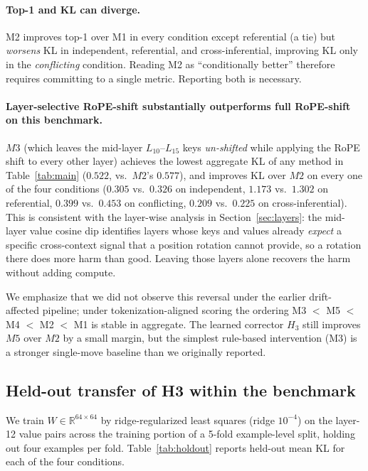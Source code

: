 \paragraph{Top-1 and KL can diverge.} M2 improves top-1 over M1 in every condition except referential (a tie) but \emph{worsens} KL in independent, referential, and cross-inferential, improving KL only in the \emph{conflicting} condition. Reading M2 as ``conditionally better'' therefore requires committing to a single metric. Reporting both is necessary.

\paragraph{Layer-selective RoPE-shift substantially outperforms full RoPE-shift on this benchmark.} $M3$ (which leaves the mid-layer $L_{10}$--$L_{15}$ keys \emph{un-shifted} while applying the RoPE shift to every other layer) achieves the lowest aggregate KL of any method in Table~\ref{tab:main} ($0.522$, vs.\ $M2$'s $0.577$), and improves KL over $M2$ on every one of the four conditions ($0.305$ vs.\ $0.326$ on independent, $1.173$ vs.\ $1.302$ on referential, $0.399$ vs.\ $0.453$ on conflicting, $0.209$ vs.\ $0.225$ on cross-inferential). This is consistent with the layer-wise analysis in Section~\ref{sec:layers}: the mid-layer value cosine dip identifies layers whose keys and values already \emph{expect} a specific cross-context signal that a position rotation cannot provide, so a rotation there does more harm than good. Leaving those layers alone recovers the harm without adding compute.

We emphasize that we did not observe this reversal under the earlier drift-affected pipeline; under tokenization-aligned scoring the ordering M3 $<$ M5 $<$ M4 $<$ M2 $<$ M1 is stable in aggregate. The learned corrector $H_3$ still improves $M5$ over $M2$ by a small margin, but the simplest rule-based intervention (M3) is a stronger single-move baseline than we originally reported.

\subsection{Held-out transfer of H3 within the benchmark}\label{sec:holdout}

We train $W \in \mathbb{R}^{64\times64}$ by ridge-regularized least squares (ridge $10^{-4}$) on the layer-12 value pairs across the training portion of a 5-fold example-level split, holding out four examples per fold. Table~\ref{tab:holdout} reports held-out mean KL for each of the four conditions.

